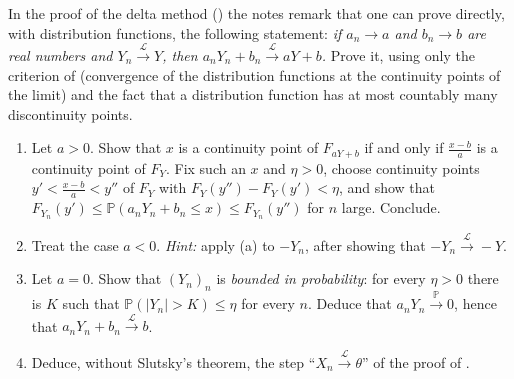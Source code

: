 
\begin{exercise}\label{ex:ct-affine}
\medium In the proof of the delta method () the notes remark that one can
prove directly, with distribution functions, the following statement: \emph{if $a_n\to a$ and
$b_n\to b$ are real numbers and $Y_n\xrightarrow{\mathcal L}Y$, then
$a_nY_n+b_n\xrightarrow{\mathcal L}aY+b$.} Prove it, using only the criterion of
 (convergence of the distribution functions at the continuity points
of the limit) and the fact that a distribution function has at most countably many discontinuity
points.
\begin{enumerate}[label=(\alph*)]
  \item Let $a>0$. Show that $x$ is a continuity point of $F_{aY+b}$ if and only if
    $\frac{x-b}a$ is a continuity point of $F_Y$. Fix such an $x$ and $\eta>0$, choose continuity
    points $y'<\frac{x-b}a<y''$ of $F_Y$ with $F_Y(y'')-F_Y(y')<\eta$, and show that
    $F_{Y_n}(y')\le\mathbb P(a_nY_n+b_n\le x)\le F_{Y_n}(y'')$ for $n$ large. Conclude.
  \item Treat the case $a<0$. \emph{Hint:} apply (a) to $-Y_n$, after showing that
    $-Y_n\xrightarrow{\mathcal L}-Y$.
  \item Let $a=0$. Show that $(Y_n)_n$ is \emph{bounded in probability}: for every $\eta>0$ there
    is $K$ such that $\mathbb P(|Y_n|>K)\le\eta$ for every $n$. Deduce that
    $a_nY_n\xrightarrow{\mathbb P}0$, hence that $a_nY_n+b_n\xrightarrow{\mathcal L}b$.
  \item Deduce, without Slutsky's theorem, the step ``$X_n\xrightarrow{\mathcal L}\theta$'' of the
    proof of .
\end{enumerate}
\end{exercise}

